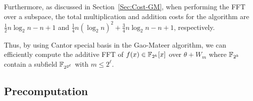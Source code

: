 
Furthermore, as discussed in Section~\ref{Sec:Cost-GM}, when performing the FFT over a subspace, the total multiplication and addition costs for the algorithm are $\frac{1}{2}n\log_2n - n+1$ and $\frac{1}{4}n(\log_2n)^2 + \frac{3}{4}n\log_2n - n +1$, respectively.

Thus, by using Cantor special basis in the Gao-Mateer algorithm, we can efficiently compute the additive FFT of $f(x)\in {\mathbb F}_{2^k}[x]$ over $\theta + W_m$ where ${\mathbb F}_{2^k}$ contain a subfield ${\mathbb F}_{2^{2^\ell}}$ with $m \leq 2^{\ell}$.




\subsection{Precomputation}\label{sec:gao-precmp}

